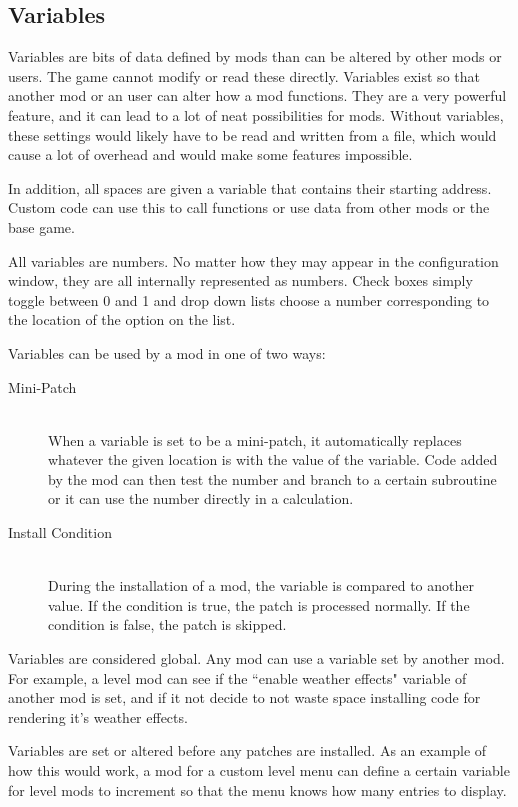 \documentclass[12pt,a4paper,notitlepage]{article}
\begin{document}
\subsection{Variables}
\label{subsec:works-var}
Variables are bits of data defined by mods than can be altered by other mods or users. The game cannot modify or read these directly. Variables exist so that another mod or an user can alter how a mod functions. They are a very powerful feature, and it can lead to a lot of neat possibilities for mods. Without variables, these settings would likely have to be read and written from a file, which would cause a lot of overhead and would make some features impossible.

In addition, all spaces are given a variable that contains their starting address. Custom code can use this to call functions or use data from other mods or the base game.

All variables are numbers. No matter how they may appear in the configuration window, they are all internally represented as numbers. Check boxes simply toggle between 0 and 1 and drop down lists choose a number corresponding to the location of the option on the list.

Variables can be used by a mod in one of two ways:

\begin{description}
\item[Mini-Patch] \hfill \\ 
    When a variable is set to be a mini-patch, it automatically replaces whatever the given location is with the value of the variable. Code added by the mod can then test the number and branch to a certain subroutine or it can use the number directly in a calculation.
\item[Install Condition] \hfill \\
    During the installation of a mod, the variable is compared to another value. If the condition is true, the patch is processed normally. If the condition is false, the patch is skipped.
\end{description}

Variables are considered global. Any mod can use a variable set by another mod. For example, a level mod can see if the ``enable weather effects" variable of another mod is set, and if it not decide to not waste space installing code for rendering it's weather effects.

Variables are set or altered before any patches are installed. As an example of how this would work, a mod for a custom level menu can define a certain variable for level mods to increment so that the menu knows how many entries to display.
\end{document}
